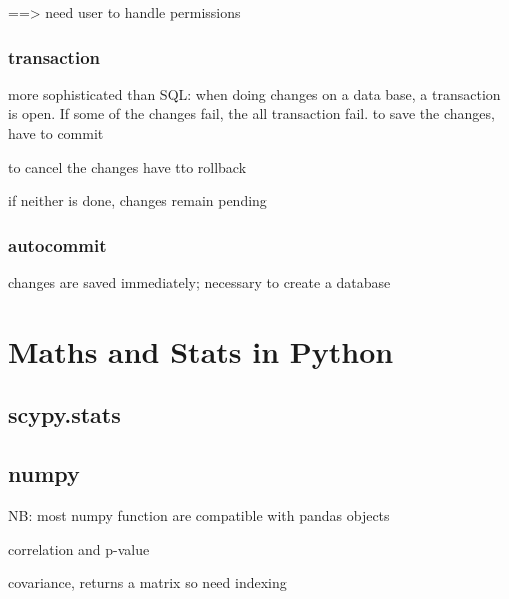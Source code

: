 
			 ==> need user to handle permissions

		\subsubsection{transaction}
	
			more sophisticated than SQL: when doing changes on a data base, a transaction is open. If some of the changes fail, the all transaction fail. 
			 to save the changes, have to commit

			 to cancel the changes have tto rollback

			if neither is done, changes remain pending

		\subsubsection{autocommit}
			 changes are saved immediately; necessary to create a database


\section{Maths and Stats in Python}

	\subsection{scypy.stats}





	\subsection{numpy}

		NB: most numpy function are compatible with pandas objects
		


		 correlation and p-value

		 covariance, returns a matrix so need indexing


